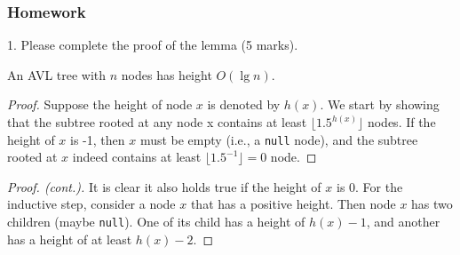 \documentclass[aspectratio=169, 14pt]{beamer}
\begin{document}
\begin{frame}
    \frametitle{Homework}
1. Please complete the proof of the lemma (5 marks).
  \begin{lemma}
    An AVL tree with $n$ nodes has height $O(\lg{n})$. 
    \end{lemma} 
    \begin{proof}
    Suppose the height of node $x$ is denoted by $h(x)$. We start by showing that \alert{the subtree rooted at any node x contains at least $\lfloor 1.5^{h(x)} \rfloor$ nodes}. If the height of $x$ is -1, then $x$ must be empty (i.e., a \texttt{null} node), and the subtree rooted at $x$ indeed contains at least $\lfloor 1.5^{-1} \rfloor = 0$ node.
    \end{proof}
    \end{frame}
    
    \begin{frame}
        \begin{proof}[Proof. (cont.)]
            It is clear it also holds true if the height of $x$ is 0. For the inductive step, consider a node $x$ that has a positive height. Then node $x$ has two children (maybe \texttt{null}). One of its child has a height of $h(x)-1$, and another has a height of at least $h(x) - 2$. 
            
            \end{proof}
    \end{frame}
\end{document}
